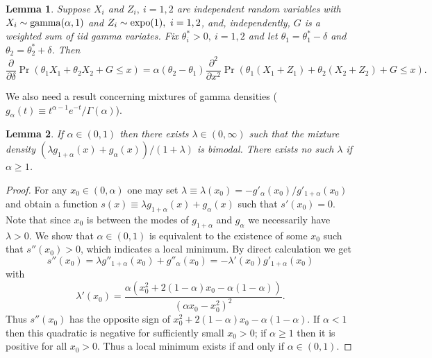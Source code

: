 \documentclass[11pt]{article}
\newtheorem{lemma}{\bf Lemma}
\begin{document}
\begin{lemma}
\label{lem2}
Suppose $X_i$ and $Z_i,\ i=1,2$ are independent random variables with $X_i\sim {\rm gamma}(\alpha, 1)$ and $Z_i\sim {\rm expo}(1),\ i =1, 2$, and, independently, $G$ is a weighted sum of iid gamma variates.  Fix $\theta_i^*>0,\ i=1,2$ and let $\theta_1 = \theta_1^* -\delta$ and $\theta_2 = \theta_2^* +\delta$.  Then 
$$\frac{\partial}{\partial \delta} \Pr(\theta_1 X_1 + \theta_2 X_2 + G\leq x) = \alpha (\theta_2 -\theta_1) \frac{\partial^2}{\partial x^2} \Pr(\theta_1(X_1 + Z_1) + \theta_2 (X_2 + Z_2) + G\leq x).
$$
\end{lemma}
We also need a result concerning mixtures of gamma densities ($g_\alpha(t)\equiv t^{\alpha -1} e^{-t}/\Gamma(\alpha)$).
\begin{lemma}
\label{lem3}
If $\alpha \in (0, 1)$ then there exists $\lambda \in (0, \infty)$ such that the mixture density $(\lambda g_{1+\alpha}(x) + g_{\alpha}(x))/(1+\lambda)$ is bimodal.  There exists no such $\lambda$ if $\alpha \geq 1$.
\end{lemma}
\begin{proof}
For any $x_0\in (0, \alpha)$ one may set $\lambda \equiv \lambda(x_0)= - g'_{\alpha}(x_0) / g'_{1+\alpha}(x_0)$ and obtain a function $s(x)\equiv \lambda g_{1+\alpha}(x) + g_{\alpha}(x)$ such that $s'(x_0) = 0$.  Note that since $x_0$ is between the modes of $g_{1+\alpha}$ and $g_{\alpha}$ we necessarily have $\lambda>0$.  We show that $\alpha\in (0, 1)$ is equivalent to the existence of some $x_0$ such that $s''(x_0)>0$, which indicates a local minimum.  By direct calculation we get 
$$s''(x_0)  = \lambda g''_{1+\alpha}(x_0) + g''_{\alpha}(x_0) = -\lambda'(x_0) g'_{1+\alpha}(x_0)$$
with 
$$ \lambda'(x_0) =\frac{\alpha (x_0^2 + 2(1-\alpha )x_0 - \alpha(1-\alpha))}{(\alpha x_0- x_0^2)^2}. $$
Thus $s''(x_0)$ has the opposite sign of $x_0^2 + 2(1-\alpha )x_0 - \alpha(1-\alpha)$.  If $\alpha<1$ then this quadratic is negative for sufficiently small $x_0>0$; if $\alpha \geq 1$ then it is positive for all $x_0>0$.  Thus a local minimum exists if and only if $\alpha\in (0, 1)$. 
\end{proof}
\end{document}
